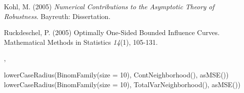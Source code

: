 \begin{References}\relax
Kohl, M. (2005) \emph{Numerical Contributions to the Asymptotic Theory of Robustness}. 
Bayreuth: Dissertation.

Ruckdeschel, P. (2005) Optimally One-Sided Bounded Influence Curves.
Mathematical Methods in Statistics \emph{14}(1), 105-131.
\end{References}
\begin{SeeAlso}\relax
{}, 
\end{SeeAlso}
\begin{Examples}
\begin{ExampleCode}
lowerCaseRadius(BinomFamily(size = 10), ContNeighborhood(), asMSE())
lowerCaseRadius(BinomFamily(size = 10), TotalVarNeighborhood(), asMSE())
\end{ExampleCode}
\end{Examples}

